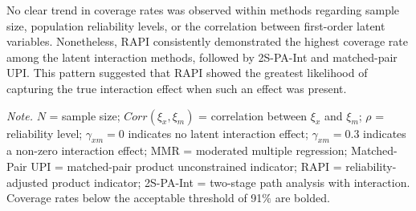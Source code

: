\documentclass[
  man,mask]{apa6}
\newenvironment{lltable}{\begin{landscape}\centering\begin{ThreePartTable}}{\end{ThreePartTable}\end{landscape}}
\begin{document}
No clear trend in coverage rates was observed within methods regarding sample size, population reliability levels, or the correlation between first-order latent variables. Nonetheless, RAPI consistently demonstrated the highest coverage rate among the latent interaction methods, followed by 2S-PA-Int and matched-pair UPI. This pattern suggested that RAPI showed the greatest likelihood of capturing the true interaction effect when such an effect was present.

\begin{lltable}

\begin{TableNotes}[para]
\normalsize{\textit{Note.} $\textit{N}$ = sample size; $Corr(\xi_{x}, \xi_{m})$ = correlation between $\xi_{x}$ and $\xi_{m}$; $\rho$ = reliability level; $\gamma_{xm} = 0$ indicates no latent interaction effect; $\gamma_{xm} = 0.3$ indicates a non-zero interaction effect; MMR = moderated multiple regression; Matched-Pair UPI = matched-pair product unconstrained indicator; RAPI = reliability-adjusted product indicator; 2S-PA-Int = two-stage path analysis with interaction. Coverage rates below the acceptable threshold of 91$\%$ are bolded.}
\end{TableNotes}

\tiny{

}
\end{lltable}
\end{document}
